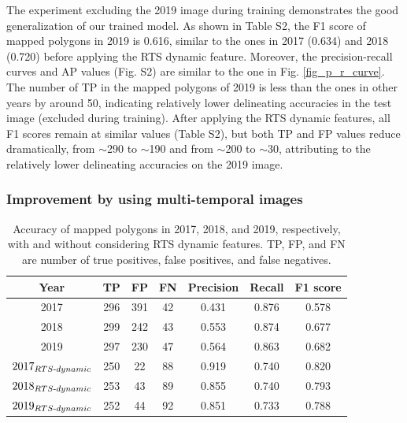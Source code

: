 \documentclass[authoryear,preprint,review,12pt]{elsarticle}
\begin{document}
The experiment excluding the 2019 image during training demonstrates the good generalization of our trained model. 
As shown in Table S2, the F1 score of mapped polygons in 2019 is 0.616, similar to the ones in 2017  (0.634) and 2018 (0.720) before applying the RTS dynamic feature.
Moreover, the precision-recall curves and AP values (Fig. S2) are similar to the one in Fig. \ref{fig_p_r_curve}.
The number of TP in the mapped polygons of 2019 is less than the ones in other years by around 50, indicating relatively lower delineating accuracies in the test image (excluded during training). 
After applying the RTS dynamic features, all F1 scores remain at similar values (Table S2), but both TP and FP values reduce dramatically, from $\sim$290 to $\sim$190 and from $\sim$200 to $\sim$30, attributing to the relatively lower delineating accuracies on the 2019 image.



\subsubsection{Improvement by using multi-temporal images}
\label{sec_improve_using_multi_images}


\begin{table}[ht]
\footnotesize
  \centering
  \caption{Accuracy of mapped polygons in 2017, 2018, and 2019, respectively, with and without considering RTS dynamic features. TP, FP, and FN are number of true positives, false positives, and false negatives.}
    \begin{tabular}{c c c c c c c}
\toprule
    \textbf{Year} & \textbf{TP} & \textbf{FP} & \textbf{FN} & \textbf{Precision} & \textbf{Recall} & \textbf{F1 score} \\
\midrule
   2017 & 296   & 391   & 42    & 0.431 & 0.876 & 0.578 \\
   2018 & 299   & 242   & 43    & 0.553 & 0.874 & 0.677 \\
   2019 & 297   & 230   & 47    & 0.564 & 0.863 & 0.682 \\
   $2017_{RTS{\text -}dynamic}$ & 250   & 22    & 88    & 0.919 & 0.740 & 0.820 \\
   $2018_{RTS{\text -}dynamic}$ & 253   & 43    & 89    & 0.855 & 0.740 & 0.793 \\
   $2019_{RTS{\text -}dynamic}$ & 252   & 44    & 92    & 0.851 & 0.733 & 0.788 \\

\bottomrule
    \end{tabular}
  \label{table_accuracy_f1}
\end{table}
\end{document}
